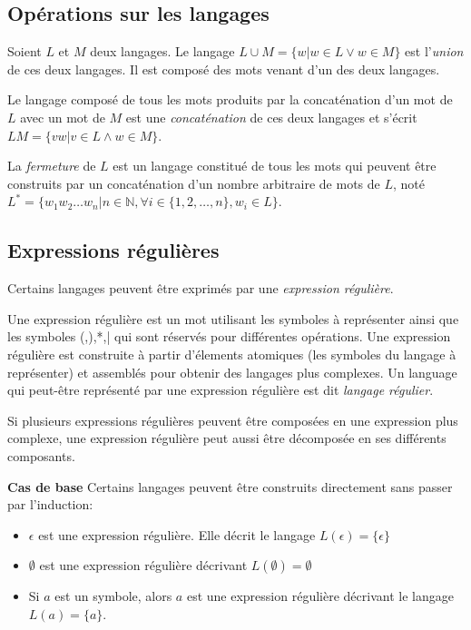 \subsection{Opérations sur les langages}

Soient $L$ et $M$ deux langages. Le langage $L \cup M = \{w | w \in L\vee w \in M\}$ est l'\emph{union} de ces deux langages. Il est composé des mots venant d'un des deux langages.

Le langage composé de tous les mots produits par la concaténation d'un mot de $L$ avec un mot de $M$ est une \emph{concaténation} de ces deux langages et s'écrit $LM = \{vw | v \in L \wedge w \in M\}$.

La \emph{fermeture} de $L$ est un langage constitué de tous les mots qui peuvent être construits par un concaténation d'un nombre arbitraire de mots de $L$, noté $L^*=\{w_1w_2\dots w_n|n\in \mathbb{N},\forall i \in \{1,2,\dots,n\}, w_i \in L\}$.


\subsection{Expressions régulières}\label{ss:regex}

Certains langages peuvent être exprimés par une \emph{expression régulière}.

Une expression régulière est un mot utilisant les symboles à représenter ainsi que les symboles (,),*,| qui sont réservés pour différentes opérations. Une expression régulière est construite à partir d'élements atomiques (les symboles du langage à représenter) et assemblés pour obtenir des langages plus complexes. Un language qui peut-être représenté par une expression régulière est dit \emph{langage régulier}.

Si plusieurs expressions régulières peuvent être composées en une expression plus complexe, une expression régulière peut aussi être décomposée en ses différents composants.

\textbf{Cas de base}
Certains langages peuvent être construits directement sans passer par l'induction:

\begin{itemize}
	\item $\epsilon$ est une expression régulière. Elle décrit le langage $L(\epsilon)=\{\epsilon\}$
	\item $\emptyset$ est une expression régulière décrivant $L(\emptyset)=\emptyset$
	\item Si $a$ est un symbole, alors $a$ est une expression régulière décrivant le langage $L(a) = \{a\}$.
\end{itemize}


